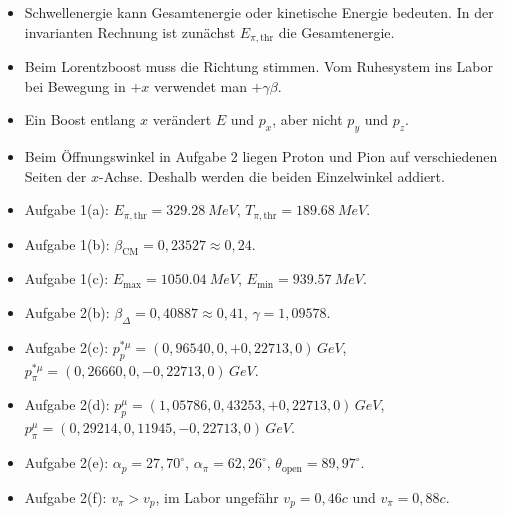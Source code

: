 \documentclass[11pt,a4paper]{scrartcl}
\newcommand{\paren}[1]{\left( #1 \right)}
\newcommand{\GeV}{\si{GeV}}
\newcommand{\fourp}[4]{\paren{#1,#2,#3,#4}}
\theoremstyle{definition}
\theoremstyle{plain}
\theoremstyle{remark}
\begin{document}
\begin{warningbox}[title={Typische Fehlerquellen}]
\begin{itemize}
    \item Schwellenergie kann Gesamtenergie oder kinetische Energie bedeuten. In der invarianten Rechnung ist zun\"achst $E_{\pi,\mathrm{thr}}$ die Gesamtenergie.
    \item Beim Lorentzboost muss die Richtung stimmen. Vom Ruhesystem ins Labor bei Bewegung in $+x$ verwendet man $+\gamma\beta$.
    \item Ein Boost entlang $x$ ver\"andert $E$ und $p_x$, aber nicht $p_y$ und $p_z$.
    \item Beim \"Offnungswinkel in Aufgabe 2 liegen Proton und Pion auf verschiedenen Seiten der $x$-Achse. Deshalb werden die beiden Einzelwinkel addiert.
\end{itemize}
\end{warningbox}

\begin{summarybox}[title={Endergebnisse}]
\begin{itemize}
    \item Aufgabe 1(a): $E_{\pi,\mathrm{thr}}=\SI{329,28}{MeV}$, $T_{\pi,\mathrm{thr}}=\SI{189,68}{MeV}$.
    \item Aufgabe 1(b): $\beta_{\mathrm{CM}}=0,23527\approx 0,24$.
    \item Aufgabe 1(c): $E_{\max}=\SI{1050,04}{MeV}$, $E_{\min}=\SI{939,57}{MeV}$.
    \item Aufgabe 2(b): $\beta_\Delta=0,40887\approx 0,41$, $\gamma=1,09578$.
    \item Aufgabe 2(c): $p_p^{\ast\mu}=\fourp{0,96540}{0}{+0,22713}{0}\,\GeV$, $p_\pi^{\ast\mu}=\fourp{0,26660}{0}{-0,22713}{0}\,\GeV$.
    \item Aufgabe 2(d): $p_p^\mu=\fourp{1,05786}{0,43253}{+0,22713}{0}\,\GeV$, $p_\pi^\mu=\fourp{0,29214}{0,11945}{-0,22713}{0}\,\GeV$.
    \item Aufgabe 2(e): $\alpha_p=27,70^\circ$, $\alpha_\pi=62,26^\circ$, $\theta_{\mathrm{open}}=89,97^\circ$.
    \item Aufgabe 2(f): $v_\pi>v_p$, im Labor ungef\"ahr $v_p=0,46c$ und $v_\pi=0,88c$.
\end{itemize}
\end{summarybox}
\end{document}
